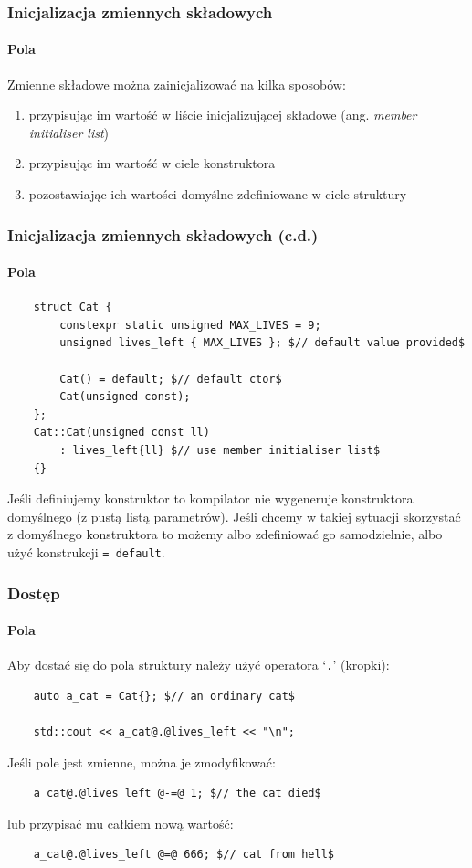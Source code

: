 \documentclass[aspectratio=169]{beamer}
\begin{document}
\begin{frame}
    \frametitle{Inicjalizacja zmiennych składowych}
    \framesubtitle{Pola}

    Zmienne składowe można zainicjalizować na kilka sposobów:
    \begin{enumerate}
        \item przypisując im wartość w liście inicjalizującej składowe (ang.
            \emph{member initialiser list})
        \item przypisując im wartość w ciele konstruktora
        \item pozostawiając ich wartości domyślne zdefiniowane w ciele struktury
    \end{enumerate}
\end{frame}

\begin{frame}[fragile]
    \frametitle{Inicjalizacja zmiennych składowych (c.d.)}
    \framesubtitle{Pola}

    {\scriptsize
    \begin{lstlisting}
    struct Cat {
        constexpr static unsigned MAX_LIVES = 9;
        unsigned lives_left { MAX_LIVES }; $// default value provided$

        Cat() = default; $// default ctor$
        Cat(unsigned const);
    };
    Cat::Cat(unsigned const ll)
        : lives_left{ll} $// use member initialiser list$
    {}
    \end{lstlisting}}

    Jeśli definiujemy konstruktor to kompilator nie wygeneruje konstruktora
    domyślnego (z pustą listą parametrów). Jeśli chcemy w takiej sytuacji
    skorzystać z domyślnego konstruktora to możemy albo zdefiniować go
    samodzielnie, albo użyć konstrukcji {\tt = default}.
\end{frame}

\begin{frame}[fragile]
    \frametitle{Dostęp}
    \framesubtitle{Pola}

    Aby dostać się do pola struktury należy użyć operatora `{\tt .}' (kropki):

    {\small
    \begin{lstlisting}
    auto a_cat = Cat{}; $// an ordinary cat$

    std::cout << a_cat@.@lives_left << "\n";
    \end{lstlisting}}

    Jeśli pole jest zmienne, można je zmodyfikować:

    {\small
    \begin{lstlisting}
    a_cat@.@lives_left @-=@ 1; $// the cat died$
    \end{lstlisting}}

    lub przypisać mu całkiem nową wartość:

    {\small
    \begin{lstlisting}
    a_cat@.@lives_left @=@ 666; $// cat from hell$
    \end{lstlisting}}
\end{frame}
\end{document}
